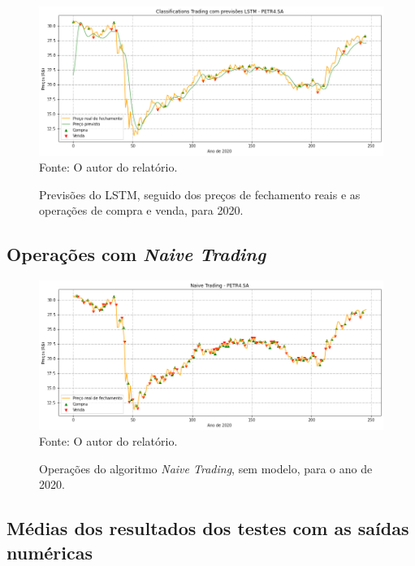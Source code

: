\begin{figure}[H]
\centering
\caption{\label{figure:figura1}Previsões do LSTM, seguido dos preços de fechamento reais e as operações de compra e venda, para 2020.}
  \includegraphics[scale=0.5]{figures/img19.png}
  Fonte: O autor do relatório.
\end{figure}

\subsection{Operações com \textit{Naive Trading}}


\begin{figure}[hbt]
\centering
\caption{\label{figure:figura1}Operações do algoritmo \textit{Naive Trading}, sem modelo, para o ano de 2020.}
  \includegraphics[scale=0.5]{figures/img13.png}
  Fonte: O autor do relatório.
\end{figure}


\subsection{\textbf{Médias dos resultados dos testes com as saídas numéricas}}



